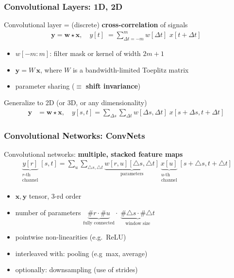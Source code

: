 \documentclass[compress]{beamer}
\newcommand{\x}{{\mathbf x}}
\newcommand{\y}{{\mathbf y}}
\newcommand{\w}{{\mathbf w}}
\newcommand{\W}{{W}}
\newcommand{\textbblue}[1]{{\bf\color{Blue} #1}}
\newcommand{\textbred}[1]{{\bf\color{Red} #1}}
\newcommand{\is}[1]{\setlength{\itemsep}{#1}}
\begin{document}
\begin{frame} \frametitle{Convolutional Layers: 1D, 2D}

Convolutional layer = (discrete) \textbblue{cross-correlation} of signals 
\begin{align*}
\y= \w \star \x, \quad   y[t] \; = \sum_{\Delta t=-m}^m w[\Delta t] \,\, x[t+\Delta t]
\end{align*}
\vspace*{-2mm}
\begin{itemize} \is{2mm}
\item $w[-m\!:\!m]$: filter mask or kernel of width $2m+1$
\item $\y = \W \,\x$, where $\W$ is a bandwidth-limited Toeplitz matrix
\item parameter sharing ($\equiv$ \textbblue{shift invariance})
\end{itemize}
\vspace*{3mm}
Generalize to 2D (or 3D, or any dimensionality)
\begin{align*}
\y & = \w \star \x, \quad y[s,t]  = \sum_{\Delta s} \sum_{\Delta t} w[\Delta s,\Delta t] \; x[s+\Delta s, t+\Delta t ] 
\end{align*}
\end{frame}


\begin{frame} \frametitle{Convolutional Networks: ConvNets}
Convolutional networks: \textbred{multiple, stacked feature maps}
\begin{align*}
\underbrace{y[r]}_{\substack{\text{$r$-th} \\ \text{channel}}}[s,t] = \sum_{u} \sum_{\triangle s, \triangle t}  \underbrace{w[r,u][\triangle s, \triangle t]}_{\text{parameters}} \underbrace{x[u]}_{\substack{\text{$u$-th}\\\text{channel}}}[s+\triangle s,t + \triangle t]
\end{align*}

\begin{itemize} \is{2mm}
\item $\x, \y$ tensor, $3$-rd order
\item number of parameters $\underbrace{\#r \cdot \#u}_{\text{fully connected}} \cdot \;\underbrace{\#\triangle s \cdot \# \triangle t}_{\text{window size}}$
\item pointwise non-linearities (e.g.~ReLU) 
\item interleaved with: pooling (e.g~max, average)
\item optionally: downsampling (use of strides)
\end{itemize}
\end{frame}
\end{document}

